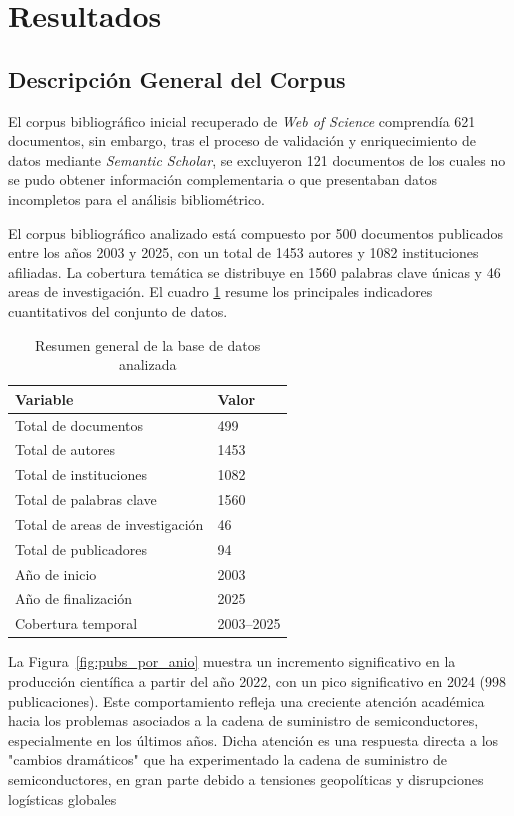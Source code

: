 \documentclass[twoside, twocolumn]{article}
\newcommand{\1}{\mathds{1}}						%
\begin{document}
\section{Resultados}

\subsection{Descripción General del Corpus}

El corpus bibliográfico inicial recuperado de \textit{Web of Science} comprendía 621 documentos, sin embargo, tras el proceso de validación y enriquecimiento de datos mediante \textit{Semantic Scholar}, se excluyeron 121 documentos de los cuales no se pudo obtener información complementaria o que presentaban datos incompletos para el análisis bibliométrico.

El corpus bibliográfico analizado está compuesto por 500 documentos publicados entre los años 2003 y 2025, con un total de 1453 autores y 1082 instituciones afiliadas. La cobertura temática se distribuye en 1560 palabras clave únicas y 46 areas de investigación. El cuadro \ref{tab:resumen_corpus} resume los principales indicadores cuantitativos del conjunto de datos.

\begin{table}[H]
\centering
\caption{Resumen general de la base de datos analizada}
\begin{tabular}{ll}
\toprule
\textbf{Variable} & \textbf{Valor} \\
\midrule
Total de documentos       & 499 \\
Total de autores          & 1453 \\
Total de instituciones    & 1082 \\
Total de palabras clave   & 1560 \\
Total de areas de investigación   & 46 \\
Total de publicadores   & 94 \\
Año de inicio             & 2003 \\
Año de finalización       & 2025 \\
Cobertura temporal        & 2003--2025 \\
\bottomrule
\end{tabular}
\label{tab:resumen_corpus}
\end{table}



La Figura~\ref{fig:pubs_por_anio} muestra un incremento significativo en la producción científica a partir del año 2022, con un pico significativo en 2024 (998 publicaciones). Este comportamiento refleja una creciente atención académica hacia los problemas asociados a la cadena de suministro de semiconductores, especialmente en los últimos años. Dicha atención es una respuesta directa a los "cambios dramáticos" que ha experimentado la cadena de suministro de semiconductores, en gran parte debido a tensiones geopolíticas y disrupciones logísticas globales \cite{Xiong2024}
\end{document}
